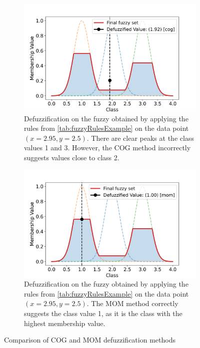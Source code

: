 \begin{figure}
    \centering
    \begin{subfigure}[t]{0.48\textwidth}
        \centering
        \includegraphics[width=\textwidth,trim={0 0 0 1cm},clip]{figures/ProofOfConcepts/fuzzy_set_for_data_cog.png}
        \caption[Resulting Fuzzy Set after applying the Rules on specific Data, COG Method]{Defuzzification on the fuzzy obtained by applying the rules from \autoref{tab:fuzzyRulesExample} on the data point $(x=2.95, y=2.5)$. There are clear peaks at the class values 1 and 3. However, the COG method incorrectly suggests values close to class 2.}
        \label{fig:fuzzySetForDataCOG}
    \end{subfigure}
    \hfill
    \begin{subfigure}[t]{0.48\textwidth}
        \centering
        \includegraphics[width=\textwidth,trim={0 0 0 1cm},clip]{figures/ProofOfConcepts/fuzzy_set_for_data_mom.png}
        \caption[Resulting Fuzzy Set after applying the Rules on specific Data, MOM Method]{Defuzzification on the fuzzy obtained by applying the rules from \autoref{tab:fuzzyRulesExample} on the data point $(x=2.95, y=2.5)$. The MOM method correctly suggests the class value 1, as it is the class with the highest membership value.}
        \label{fig:fuzzySetForDataMOM}
    \end{subfigure}
    \caption{Comparison of COG and MOM defuzzification methods}
    \label{fig:fuzzySetComparison}
\end{figure}

